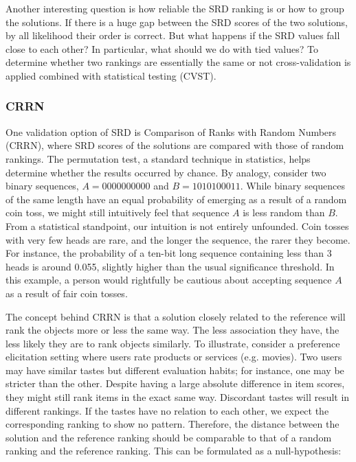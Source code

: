 Another interesting question is how reliable the SRD ranking is or how to group the solutions. If there is a huge gap between the SRD scores of the two solutions, by all likelihood their order is correct. But what happens if the SRD values fall close to each other? In particular, what should we do with tied values? To determine whether two rankings are essentially the same or not cross-validation is applied combined with statistical testing (CVST).

\subsubsection{CRRN}

One validation option of SRD is Comparison of Ranks with Random Numbers (CRRN), where SRD scores of the solutions are compared with those of random rankings. The permutation test, a standard technique in statistics, helps determine whether the results occurred by chance. By analogy, consider two binary sequences, $A = 0000000000$ and $B = 1010100011$. While binary sequences of the same length have an equal probability of emerging as a result of a random coin toss, we might still intuitively feel that sequence $A$ is less random than $B$. From a statistical standpoint, our intuition is not entirely unfounded. Coin tosses with very few heads are rare, and the longer the sequence, the rarer they become. For instance, the probability of a ten-bit long sequence containing less than 3 heads is around 0.055, slightly higher than the usual significance threshold. In this example, a person would rightfully be cautious about accepting sequence $A$ as a result of fair coin tosses.

The concept behind CRRN is that a solution closely related to the reference will rank the objects more or less the same way. The less association they have, the less likely they are to rank objects similarly. To illustrate, consider a preference elicitation setting where users rate products or services (e.g. movies). Two users may have similar tastes but different evaluation habits; for instance, one may be stricter than the other. Despite having a large absolute difference in item scores, they might still rank items in the exact same way. Discordant tastes will result in different rankings. If the tastes have no relation to each other, we expect the corresponding ranking to show no pattern. Therefore, the distance between the solution and the reference ranking should be comparable to that of a random ranking and the reference ranking. This can be formulated as a null-hypothesis:\\

